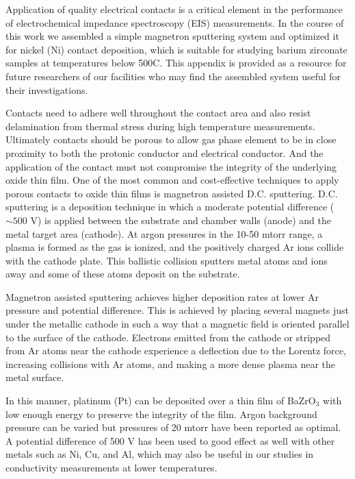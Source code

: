 

Application of quality electrical contacts is a critical element in the performance of electrochemical impedance spectroscopy (EIS) measurements. In the course of this work we assembled a simple magnetron sputtering system and optimized it for nickel (Ni) contact deposition, which is suitable for studying barium zirconate samples at temperatures below 500\textdegree C. This appendix is provided as a resource for future researchers of our facilities who may find the assembled system useful for their investigations.

Contacts need to adhere well throughout the contact area and also resist delamination from thermal stress during high temperature measurements. Ultimately contacts should be porous to allow gas phase element to be in close proximity to both the protonic conductor and electrical conductor. And the application of the contact must not compromise the integrity of the underlying oxide thin film. One of the most common and cost-effective techniques to apply porous contacts to oxide thin films is magnetron assisted D.C. sputtering. D.C. sputtering is a deposition technique in which a moderate potential difference ($\sim500$ V) is applied between the substrate and chamber walls (anode) and the metal target area (cathode). At argon pressures in the 10-50 mtorr range, a plasma is formed as the gas is ionized, and the positively charged Ar ions collide with the cathode plate. This ballistic collision sputters metal atoms and ions away and some of these atoms deposit on the substrate. 

Magnetron assisted sputtering achieves higher deposition rates at lower Ar pressure and potential difference. This is achieved by placing several magnets just under the metallic cathode in such a way that a magnetic field is oriented parallel to the surface of the cathode. Electrons emitted from the cathode or stripped from Ar atoms near the cathode experience a deflection due to the Lorentz force, increasing collisions with Ar atoms, and making a more dense plasma near the metal surface. 

In this manner, platinum (Pt) can be deposited over a thin film of BaZrO$_3$ with low enough energy to preserve the integrity of the film. Argon background pressure can be varied but pressures of 20 mtorr have been reported as optimal. A potential difference of 500 V has been used to good effect as well with other metals such as Ni, Cu, and Al, which may also be useful in our studies in conductivity measurements at lower temperatures.
